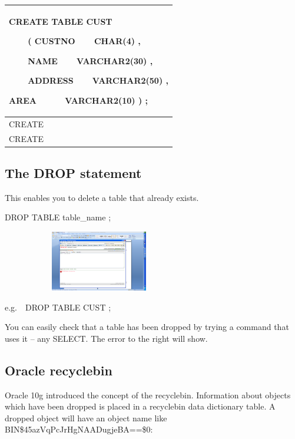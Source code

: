 \begin{flushleft}
\tablefirsthead{}
\tablehead{}
\tabletail{}
\tablelasttail{}
\begin{supertabular}{|m{14.663cm}|}
\hline
CREATE TABLE CUST

\ \ \ \ ( CUSTNO\ \ \ \ CHAR(4) ,

\ \ \ \  NAME\ \ \ \ VARCHAR2(30) ,

\ \ \ \  ADDRESS\ \ \ \ VARCHAR2(50) ,

AREA\ \ \ \ \ \ VARCHAR2(10)  ) ;

\\\hline
CREATE

\\\hline
CREATE

\\\hline
\end{supertabular}
\end{flushleft}
\subsection{}
\subsection{}
\subsection{The DROP statement}
This enables you to delete a table that already exists.

 DROP TABLE table\_name ;\ \ \ \ 



\begin{center}
  
\includegraphics[width=8.449cm,height=2.644cm]{images/img (41).png}

\end{center}
e.g.\ \ DROP TABLE CUST ;

You can easily check that a table has been dropped by trying a command that uses it -- any SELECT. The error to the right will show.

\subsection{Oracle recyclebin}
Oracle 10g introduced the concept of the recyclebin.  Information about objects which have been dropped is placed in a recyclebin data dictionary table.  A dropped object will have an object name like BIN\$45azVqPcJrHgNAADugjeBA==\$0: 

